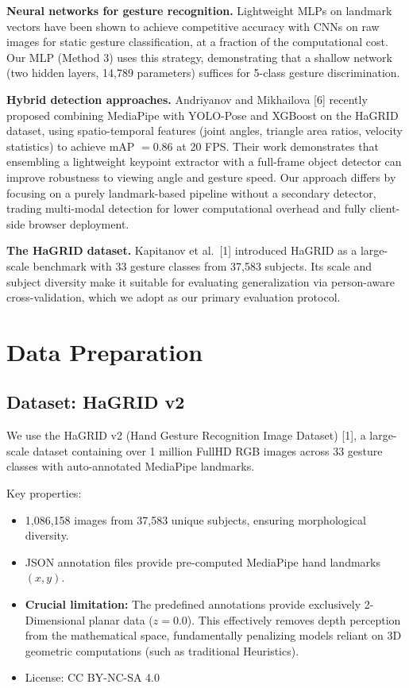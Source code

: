 \documentclass[11pt,a4paper]{article}
\begin{document}
\textbf{Neural networks for gesture recognition.} Lightweight MLPs on landmark vectors have been shown to achieve competitive accuracy with CNNs on raw images for static gesture classification, at a fraction of the computational cost. Our MLP (Method 3) uses this strategy, demonstrating that a shallow network (two hidden layers, 14,789 parameters) suffices for 5-class gesture discrimination.

\textbf{Hybrid detection approaches.} Andriyanov and Mikhailova [6] recently proposed combining MediaPipe with YOLO-Pose and XGBoost on the HaGRID dataset, using spatio-temporal features (joint angles, triangle area ratios, velocity statistics) to achieve mAP $= 0.86$ at 20 FPS. Their work demonstrates that ensembling a lightweight keypoint extractor with a full-frame object detector can improve robustness to viewing angle and gesture speed. Our approach differs by focusing on a purely landmark-based pipeline without a secondary detector, trading multi-modal detection for lower computational overhead and fully client-side browser deployment.

\textbf{The HaGRID dataset.} Kapitanov et al.\ [1] introduced HaGRID as a large-scale benchmark with 33 gesture classes from 37,583 subjects. Its scale and subject diversity make it suitable for evaluating generalization via person-aware cross-validation, which we adopt as our primary evaluation protocol.

\section{Data Preparation}
\label{sec:data}

\subsection{Dataset: HaGRID v2}

We use the HaGRID v2 (Hand Gesture Recognition Image Dataset) [1], a large-scale dataset containing over 1 million FullHD RGB images across 33 gesture classes with auto-annotated MediaPipe landmarks.

Key properties:
\begin{itemize}
    \item 1,086,158 images from 37,583 unique subjects, ensuring morphological diversity.
    \item JSON annotation files provide pre-computed MediaPipe hand landmarks $(x, y)$.
    \item \textbf{Crucial limitation:} The predefined annotations provide exclusively 2-Dimensional planar data ($z=0.0$). This effectively removes depth perception from the mathematical space, fundamentally penalizing models reliant on 3D geometric computations (such as traditional Heuristics).
    \item License: CC BY-NC-SA 4.0
\end{itemize}
\end{document}
